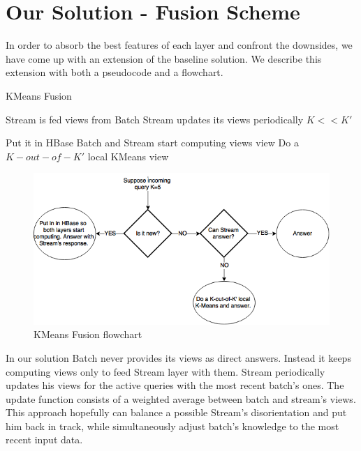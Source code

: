 \documentclass{lmproj}
\begin{document}
\section{Our Solution - Fusion Scheme}
\label{kmeans}

In order to absorb the best features of each layer and confront the downsides, we have come up with an extension of the baseline solution. We describe this extension with both a pseudocode and a flowchart.


\bigskip
	\begin{algorithm}[H]
		\caption{KMeans Fusion}\label{kmeansFusion}
		\begin{algorithmic}[1]
			\Require Stream is fed views from Batch
			\Require Stream updates its views periodically
			\Require $K<<K'$
			
				\State Put it in HBase
				\State Batch and Stream start computing views
			\Else 
					\State \Return view
				\Else 
					\State Do a $K-out-of-K'$ local KMeans
					\State \Return view
				\EndIf
			\EndIf			
			
			\EndProcedure
		\end{algorithmic}
	\end{algorithm}

\bigskip

\begin{figure}[H]
	\centering	
	\includegraphics[scale=0.5]{usecase}
	\caption{KMeans Fusion flowchart}
\end{figure}


In our solution Batch never provides its views as direct answers. Instead it keeps computing views only to feed Stream layer with them. Stream periodically updates his views for the active queries with the most recent batch's ones. The update function consists of a weighted average between batch and stream's views. This approach hopefully can balance a possible Stream's disorientation and put him back in track, while simultaneously adjust batch's knowledge to the most recent input data.
\end{document}
